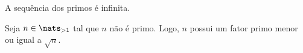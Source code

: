 \begin{exercise}
    A sequência dos primos é infinita.
\end{exercise}

\begin{exercise}
    Seja $n \in \nats_{>1}$ tal que $n$ não é primo. Logo, $n$ possui um fator
    primo menor ou igual a $\sqrt n$.
\end{exercise}
